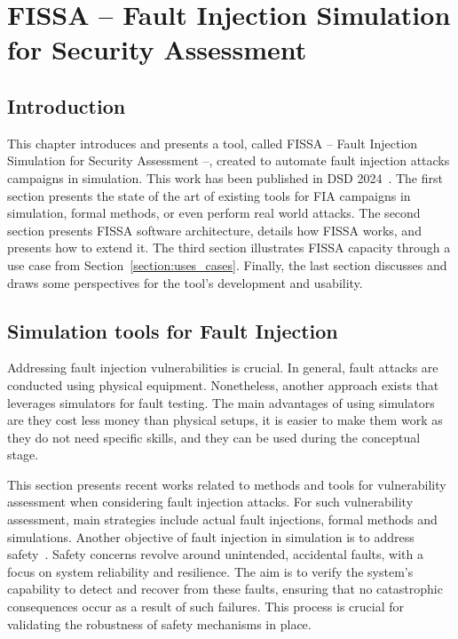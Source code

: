 \chapter{FISSA -- Fault Injection Simulation for Security Assessment}
\label{chapter:fissa}
\minitoc

\section{Introduction}
This chapter introduces and presents a tool, called FISSA -- Fault Injection Simulation for Security Assessment --, created to automate fault injection attacks campaigns in simulation.
This work has been published in DSD 2024~\cite{PLG-24-dsd}.
The first section presents the state of the art of existing tools for FIA campaigns in simulation, formal methods, or even perform real world attacks.
The second section presents FISSA software architecture, details how FISSA works, and presents how to extend it.
The third section illustrates FISSA capacity through a use case from Section~\ref{section:uses_cases}.
Finally, the last section discusses and draws some perspectives for the tool's development and usability.

\section{Simulation tools for Fault Injection}

Addressing fault injection vulnerabilities is crucial. In general, fault attacks are conducted using physical equipment. Nonetheless, another approach exists that leverages simulators for fault testing. The main advantages of using simulators are they cost less money than physical setups, it is easier to make them work as they do not need specific skills, and they can be used during the conceptual stage.

This section presents recent works related to methods and tools for vulnerability assessment when considering fault injection attacks. For such vulnerability assessment, main strategies include actual fault injections, formal methods and simulations.
Another objective of fault injection in simulation is to address safety~\cite{FTMLLE-21-icsrs}. Safety concerns revolve around unintended, accidental faults, with a focus on system reliability and resilience. The aim is to verify the system’s capability to detect and recover from these faults, ensuring that no catastrophic consequences occur as a result of such failures. This process is crucial for validating the robustness of safety mechanisms in place.

